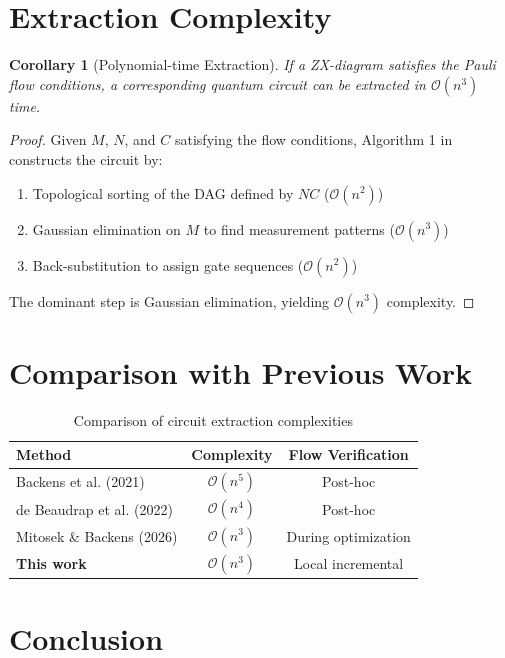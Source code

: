 \documentclass{article}
\newtheorem{corollary}{Corollary}
\begin{document}
\section{Extraction Complexity}

\begin{corollary}[Polynomial-time Extraction]
If a ZX-diagram satisfies the Pauli flow conditions, a corresponding quantum circuit can be extracted in $\mathcal{O}(n^3)$ time.
\end{corollary}

\begin{proof}
Given $M$, $N$, and $C$ satisfying the flow conditions, Algorithm 1 in \cite{Backens2021} constructs the circuit by:
\begin{enumerate}
\item Topological sorting of the DAG defined by $NC$ ($\mathcal{O}(n^2)$)
\item Gaussian elimination on $M$ to find measurement patterns ($\mathcal{O}(n^3)$)
\item Back-substitution to assign gate sequences ($\mathcal{O}(n^2)$)
\end{enumerate}
The dominant step is Gaussian elimination, yielding $\mathcal{O}(n^3)$ complexity.
\end{proof}

\section{Comparison with Previous Work}

\begin{table}[h]
\centering
\begin{tabular}{|l|c|c|}
\hline
\textbf{Method} & \textbf{Complexity} & \textbf{Flow Verification} \\
\hline
Backens et al. (2021) & $\mathcal{O}(n^5)$ & Post-hoc \\
de Beaudrap et al. (2022) & $\mathcal{O}(n^4)$ & Post-hoc \\
Mitosek \& Backens (2026) & $\mathcal{O}(n^3)$ & During optimization \\
\textbf{This work} & $\mathcal{O}(n^3)$ & Local incremental \\
\hline
\end{tabular}
\caption{Comparison of circuit extraction complexities}
\end{table}

\section{Conclusion}
\end{document}
